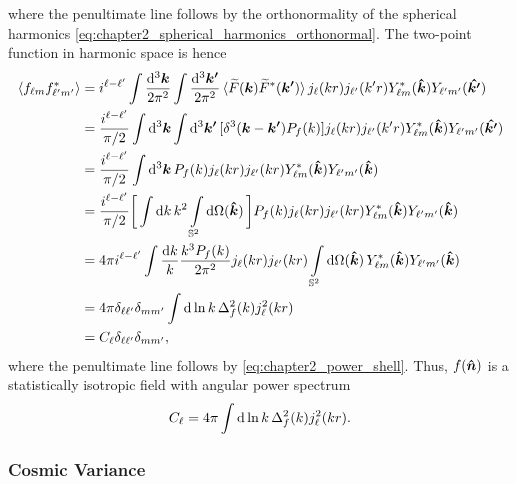 %
where the penultimate line follows by the orthonormality of the spherical harmonics \cref{eq:chapter2_spherical_harmonics_orthonormal}.
The two-point function in harmonic space is hence
%
\begin{align}
	\expval*{\harmonic{f}\conj{\harmonic[']{f}}}
	 & = i^{\ell-\ell'} \int\frac{\dd[3]{\vb*{k}}}{2\pi^{2}} \int\frac{\dd[3]{\vb*{k'}}}{2\pi^{2}} \expval*{\fourier{F}(\vb*{k}) \conj{\fourier{F}}(\vb*{k'})} \bessel{k r} \bessel[']{k'r} \conj{\harmonic{Y}}(\vu*{k}) \harmonic[']{Y}(\vu*{k'}) \nonumber{} \\
	 & = \frac{i^{\ell-\ell'}}{\pi/2} \int\dd[3]{\vb*{k}} \int\dd[3]{\vb*{k'}} [\delta^{3}(\vb*{k} - \vb*{k'}) \powerSpectrumDim{f}] \bessel{k r} \bessel[']{k'r} \conj{\harmonic{Y}}(\vu*{k}) \harmonic[']{Y}(\vu*{k'}) \nonumber{}                           \\
	 & = \frac{i^{\ell-\ell'}}{\pi/2} \int\dd[3]{\vb*{k}} \powerSpectrumDim{f} \bessel{k r} \bessel[']{k r} \conj{\harmonic{Y}}(\vu*{k}) \harmonic[']{Y}(\vu*{k}) \nonumber{}                                                                                  \\
	 & = \frac{i^{\ell-\ell'}}{\pi/2} \bigg[\int\dd{k} k^{2} \integrateSphere{\vu*{k}}\bigg] \powerSpectrumDim{f} \bessel{k r} \bessel[']{k r} \conj{\harmonic{Y}}(\vu*{k}) \harmonic[']{Y}(\vu*{k}) \nonumber{}                                               \\
	 & = 4\pi i^{\ell-\ell'} \int\frac{\dd{k}}{k} \frac{k^{3}\powerSpectrumDim{f}}{2\pi^{2}} \bessel{k r} \bessel[']{k r} \integrateSphere{\vu*{k}} \conj{\harmonic{Y}}(\vu*{k}) \harmonic[']{Y}(\vu*{k}) \nonumber{}                                          \\
	 & = 4\pi \delta_{\ell\ell'} \delta_{m m'} \int\dd{\ln{k}} \Delta_{f}^{2}(k) j^{2}_{\ell}(k r) \nonumber{}                                                                                                                                                 \\
	 & = \powerSpectrum \delta_{\ell\ell'} \delta_{m m'},
\end{align}
%
where the penultimate line follows by \cref{eq:chapter2_power_shell}.
Thus, \(f(\vu*{n})\) is a statistically isotropic field with angular power spectrum
%
\begin{equation}
	\powerSpectrum
	= 4\pi \int\dd{\ln{k}} \Delta_{f}^{2}(k) j^{2}_{\ell}(k r).
\end{equation}

\subsubsection{Cosmic Variance}

